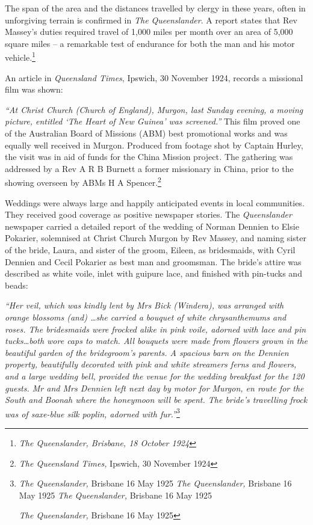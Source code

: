 The span of the area and the distances travelled by clergy in these years, often in unforgiving terrain is confirmed in \emph{The Queenslander}. A report states that Rev Massey's duties required travel of 1,000 miles per month over an area of 5,000 square miles -- a remarkable test of endurance for both the man and his motor vehicle.\footnote{\emph{The Queenslander, Brisbane, 18 October 1924}}

An article in \emph{Queensland Times}, Ipswich, 30 November 1924, records a missional film was shown:

\emph{``At Christ Church (Church of England), Murgon, last Sunday evening, a moving picture, entitled `The Heart of New Guinea' was screened.''} This film proved one of the Australian Board of Missions (ABM) best promotional works and was equally well received in Murgon. Produced from footage shot by Captain Hurley, the visit was in aid of funds for the China Mission project\emph{.} The gathering was addressed by a Rev A R B Burnett a former missionary in China, prior to the showing overseen by ABMs H A Spencer.\footnote{\emph{The Queensland Times,} Ipswich, 30 November 1924}

Weddings were always large and happily anticipated events in local communities. They received good coverage as positive newspaper stories. The \emph{Queenslander} newspaper carried a detailed report of the wedding of Norman Dennien to Elsie Pokarier, solemnised at Christ Church Murgon by Rev Massey, and naming sister of the bride, Laura, and sister of the groom, Eileen, as bridesmaids, with Cyril Dennien and Cecil Pokarier as best man and groomsman. The bride's attire was described as white voile, inlet with guipure lace, and finished with pin-tucks and beads:

\emph{``Her veil, which was kindly lent by Mrs Bick (Windera), was arranged with orange blossoms (and) \ldots she carried a bouquet of white chrysanthemums and roses. The bridesmaids were frocked alike in pink voile, adorned with lace and pin tucks\ldots both wore caps to match. All bouquets were made from flowers grown in the beautiful garden of the bridegroom's parents. A spacious barn on the Dennien property, beautifully decorated with pink and white streamers ferns and flowers, and a large wedding bell, provided the venue for the wedding breakfast for the 120 guests. Mr and Mrs Dennien left next day by motor for Murgon, en route for the South and Boonah where the honeymoon will be spent. The bride's travelling frock was of saxe-blue silk poplin, adorned with fur.''}\footnote{\emph{The Queenslander,} Brisbane 16 May 1925 \emph{The Queenslander,} Brisbane 16 May 1925 \emph{The Queenslander,} Brisbane 16 May 1925

  \emph{The Queenslander,} Brisbane 16 May 1925}

